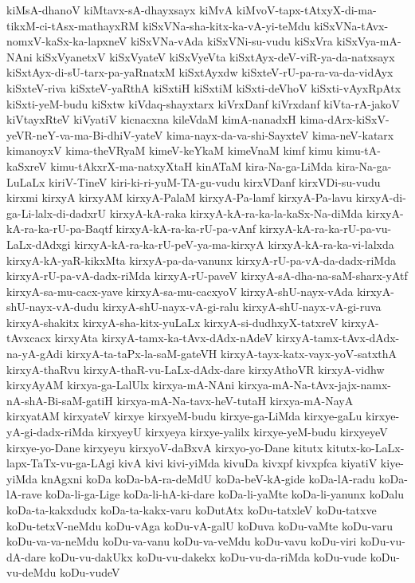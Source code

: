 {kiMsA-dhanoV
kiMtavx-sA-dhayxsayx
kiMvA
kiMvoV-tapx-tAtxyX-di-ma-tikxM-ci-tAsx-mathayxRM
kiSxVNa-sha-kitx-ka-vA-yi-teMdu
kiSxVNa-tAvx-nomxV-kaSx-ka-lapxneV
kiSxVNa-vAda
kiSxVNi-su-vudu
kiSxVra
kiSxVya-mA-NAni
kiSxVyanetxV
kiSxVyateV
kiSxVyeVta
kiSxtAyx-deV-viR-ya-da-natxsayx
kiSxtAyx-di-sU-tarx-pa-yaRnatxM
kiSxtAyxdw
kiSxteV-rU-pa-ra-va-da-vidAyx
kiSxteV-riva
kiSxteV-yaRthA
kiSxtiH
kiSxtiM
kiSxti-deVhoV
kiSxti-vAyxRpAtx
kiSxti-yeM-budu
kiSxtw
kiVdaq-shayxtarx
kiVrxDanf
kiVrxdanf
kiVta-rA-jakoV
kiVtayxRteV
kiVyatiV
kicnacxna
kileVdaM
kimA-nanadxH
kima-dArx-kiSxV-yeVR-neY-va-ma-Bi-dhiV-yateV
kima-nayx-da-va-shi-SayxteV
kima-neV-katarx
kimanoyxV
kima-theVRyaM
kimeV-keYkaM
kimeVnaM
kimf
kimu
kimu-tA-kaSxreV
kimu-tAkxrX-ma-natxyXtaH
kinATaM
kira-Na-ga-LiMda
kira-Na-ga-LuLaLx
kiriV-TineV
kiri-ki-ri-yuM-TA-gu-vudu
kirxVDanf
kirxVDi-su-vudu
kirxmi
kirxyA
kirxyAM
kirxyA-PalaM
kirxyA-Pa-lamf
kirxyA-Pa-lavu
kirxyA-di-ga-Li-lalx-di-dadxrU
kirxyA-kA-raka
kirxyA-kA-ra-ka-la-kaSx-Na-diMda
kirxyA-kA-ra-ka-rU-pa-Baqtf
kirxyA-kA-ra-ka-rU-pa-vAnf
kirxyA-kA-ra-ka-rU-pa-vu-LaLx-dAdxgi
kirxyA-kA-ra-ka-rU-peV-ya-ma-kirxyA
kirxyA-kA-ra-ka-vi-lalxda
kirxyA-kA-yaR-kikxMta
kirxyA-pa-da-vanunx
kirxyA-rU-pa-vA-da-dadx-riMda
kirxyA-rU-pa-vA-dadx-riMda
kirxyA-rU-paveV
kirxyA-sA-dha-na-saM-sharx-yAtf
kirxyA-sa-mu-cacx-yave
kirxyA-sa-mu-cacxyoV
kirxyA-shU-nayx-vAda
kirxyA-shU-nayx-vA-dudu
kirxyA-shU-nayx-vA-gi-ralu
kirxyA-shU-nayx-vA-gi-ruva
kirxyA-shakitx
kirxyA-sha-kitx-yuLaLx
kirxyA-si-dudhxyX-tatxreV
kirxyA-tAvxcacx
kirxyAta
kirxyA-tamx-ka-tAvx-dAdx-nAdeV
kirxyA-tamx-tAvx-dAdx-na-yA-gAdi
kirxyA-ta-taPx-la-saM-gateVH
kirxyA-tayx-katx-vayx-yoV-satxthA
kirxyA-thaRvu
kirxyA-thaR-vu-LaLx-dAdx-dare
kirxyAthoVR
kirxyA-vidhw
kirxyAyAM
kirxya-ga-LalUlx
kirxya-mA-NAni
kirxya-mA-Na-tAvx-jajx-namx-nA-shA-Bi-saM-gatiH
kirxya-mA-Na-tavx-heV-tutaH
kirxya-mA-NayA
kirxyatAM
kirxyateV
kirxye
kirxyeM-budu
kirxye-ga-LiMda
kirxye-gaLu
kirxye-yA-gi-dadx-riMda
kirxyeyU
kirxyeya
kirxye-yalilx
kirxye-yeM-budu
kirxyeyeV
kirxye-yo-Dane
kirxyeyu
kirxyoV-daBxvA
kirxyo-yo-Dane
kitutx
kitutx-ko-LaLx-lapx-TaTx-vu-ga-LAgi
kivA
kivi
kivi-yiMda
kivuDa
kivxpf
kivxpfca
kiyatiV
kiye-yiMda
knAgxni
koDa
koDa-bA-ra-deMdU
koDa-beV-kA-gide
koDa-lA-radu
koDa-lA-rave
koDa-li-ga-Lige
koDa-li-hA-ki-dare
koDa-li-yaMte
koDa-li-yanunx
koDalu
koDa-ta-kakxdudx
koDa-ta-kakx-varu
koDutAtx
koDu-tatxleV
koDu-tatxve
koDu-tetxV-neMdu
koDu-vAga
koDu-vA-galU
koDuva
koDu-vaMte
koDu-varu
koDu-va-va-neMdu
koDu-va-vanu
koDu-va-veMdu
koDu-vavu
koDu-viri
koDu-vu-dA-dare
koDu-vu-dakUkx
koDu-vu-dakekx
koDu-vu-da-riMda
koDu-vude
koDu-vu-deMdu
koDu-vudeV
}
